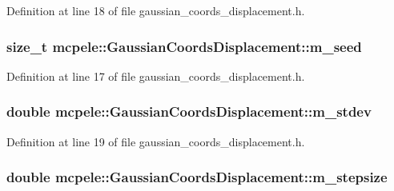 \-Definition at line 18 of file gaussian\-\_\-coords\-\_\-displacement.\-h.

\hypertarget{classmcpele_1_1GaussianCoordsDisplacement_af50ffc7add2d8e7ae70b07c04a620fb7}{
\subsubsection[{m\-\_\-seed}]{\setlength{\rightskip}{0pt plus 5cm}size\-\_\-t {\bf mcpele\-::\-Gaussian\-Coords\-Displacement\-::m\-\_\-seed}}}\label{classmcpele_1_1GaussianCoordsDisplacement_af50ffc7add2d8e7ae70b07c04a620fb7}


\-Definition at line 17 of file gaussian\-\_\-coords\-\_\-displacement.\-h.

\hypertarget{classmcpele_1_1GaussianCoordsDisplacement_a49258ed3098c51b3567e7193ccd57e70}{
\subsubsection[{m\-\_\-stdev}]{\setlength{\rightskip}{0pt plus 5cm}double {\bf mcpele\-::\-Gaussian\-Coords\-Displacement\-::m\-\_\-stdev}}}\label{classmcpele_1_1GaussianCoordsDisplacement_a49258ed3098c51b3567e7193ccd57e70}


\-Definition at line 19 of file gaussian\-\_\-coords\-\_\-displacement.\-h.

\hypertarget{classmcpele_1_1GaussianCoordsDisplacement_a9818016f14a05214f1b50f328612ed79}{
\subsubsection[{m\-\_\-stepsize}]{\setlength{\rightskip}{0pt plus 5cm}double {\bf mcpele\-::\-Gaussian\-Coords\-Displacement\-::m\-\_\-stepsize}}}\label{classmcpele_1_1GaussianCoordsDisplacement_a9818016f14a05214f1b50f328612ed79}


